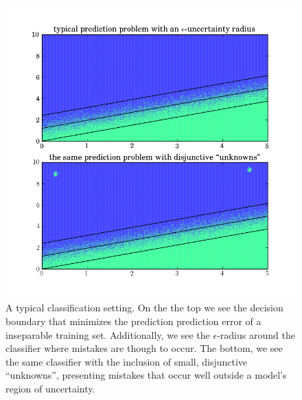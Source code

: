 \begin{figure}[hbt!]

\begin{center}
\includegraphics[width= 1.05 \columnwidth]{plots/example_function_2.png}
\end{center}
\vspace{-0.2in}
\caption{A typical classification setting. On the the top we see the decision boundary that minimizes the prediction prediction error of a inseparable training set. Additionally, we see the $\epsilon$-radius around the classifier where mistakes are though to occur. The bottom, we see the same classifier with the inclusion of small, disjunctive ``unknowns'', presenting mistakes that occur well outside a model's region of uncertainty. }
\label{fig:unknown}
\end{figure}

